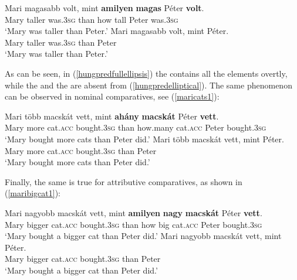 \ea \label{maripred1}
\ea \gll	Mari	magasabb volt, mint \textbf{amilyen} \textbf{magas} Péter \textbf{volt}. \label{hungpredfullellipsis}\\
Mary taller	was.\textsc{3sg} than	how	tall	Peter was.\textsc{3sg}\\
\glt `Mary was taller than Peter.'
\ex	\gll Mari	magasabb volt, mint	Péter. \label{hungpredelliptical}\\
Mary taller	was.\textsc{3sg} than	Peter\\
\glt `Mary was taller than Peter.'
\z
\z

As can be seen, in (\ref{hungpredfullellipsis}) the  contains all the elements overtly, while the  and the  are absent from (\ref{hungpredelliptical}). The same phenomenon can be observed in nominal comparatives, see (\ref{maricats1}):

\largerpage[-2]
\ea \label{maricats1}
\ea \gll Mari	több macskát vett, mint	\textbf{ahány} \textbf{macskát} Péter \textbf{vett}.\\
Mary more	cat.\textsc{acc} bought.\textsc{3sg} than	how.many cat.\textsc{acc} Peter bought.\textsc{3sg}\\
\glt `Mary bought more cats than Peter did.'
\ex \gll Mari	több macskát vett, mint	Péter.\\
Mary more	cat.\textsc{acc} bought.\textsc{3sg} than Peter\\
\glt `Mary bought more cats than Peter did.'
\z
\z

Finally, the same is true for attributive comparatives, as shown in (\ref{maribigcat1}):

\ea \label{maribigcat1}
\ea	\gll Mari nagyobb macskát vett, mint \textbf{amilyen} \textbf{nagy} \textbf{macskát} Péter \textbf{vett}.\\
Mary bigger	cat.\textsc{acc} bought.\textsc{3sg} than how big cat.\textsc{acc} Peter bought.\textsc{3sg}\\
\glt `Mary bought a bigger cat than Peter did.'
\ex \gll Mari nagyobb	macskát	vett,	mint Péter.\\
Mary bigger	cat.\textsc{acc} bought.\textsc{3sg} than	Peter\\
\glt `Mary bought a bigger cat than Peter did.'
\z
\z

